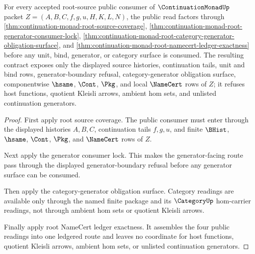 \begin{theorem}
\label{thm:continuation-monad-root-source-public-contract}
For every accepted root-source public consumer of $\ContinuationMonadUp$ packet $Z=(A,B,C,f,g,u,H,K,L,N)$, the public read factors through \autoref{thm:continuation-monad-root-source-coverage}, \autoref{thm:continuation-monad-root-generator-consumer-lock}, \autoref{thm:continuation-monad-root-category-generator-obligation-surface}, and \autoref{thm:continuation-monad-root-namecert-ledger-exactness} before any unit, bind, generator, or category surface is consumed. The resulting contract exposes only the displayed source histories, continuation tails, unit and bind rows, generator-boundary refusal, category-generator obligation surface, componentwise $\hsame$, $\Cont$, $\Pkg$, and local $\NameCert$ rows of $Z$; it refuses host functions, quotient Kleisli arrows, ambient hom sets, and unlisted continuation generators.
\end{theorem}
\begin{proof}
First apply root source coverage. The public consumer must enter through the displayed histories $A,B,C$, continuation tails $f,g,u$, and finite $\BHist$, $\hsame$, $\Cont$, $\Pkg$, and $\NameCert$ rows of $Z$.

Next apply the generator consumer lock. This makes the generator-facing route pass through the displayed generator-boundary refusal before any generator surface can be consumed.

Then apply the category-generator obligation surface. Category readings are available only through the named finite package and its $\CategoryUp$ hom-carrier readings, not through ambient hom sets or quotient Kleisli arrows.

Finally apply root NameCert ledger exactness. It assembles the four public readings into one ledgered route and leaves no coordinate for host functions, quotient Kleisli arrows, ambient hom sets, or unlisted continuation generators.
\end{proof}

